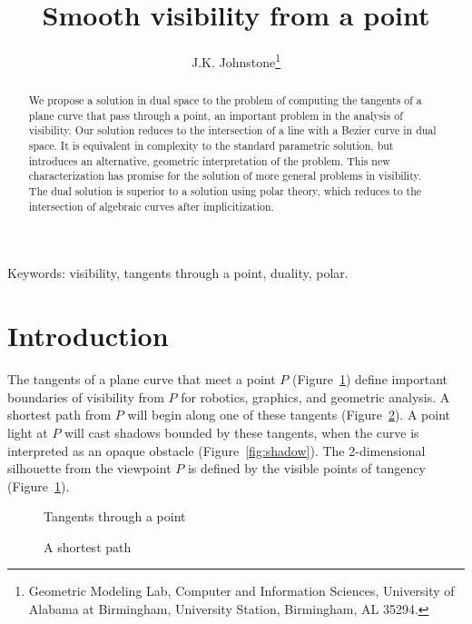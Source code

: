 \documentclass[11pt]{article}
\title{Smooth visibility from a point}
\author{J.K. Johnstone\thanks{Geometric Modeling Lab, 
	Computer and Information Sciences, University of Alabama at Birmingham, 
	University Station, Birmingham, AL 35294.}}
\begin{document}
\maketitle

\begin{abstract}
We propose a solution in dual space to the problem of
computing the tangents of a plane curve that pass through a point,
an important problem in the analysis of visibility.
Our solution reduces to the intersection of a line with a Bezier curve
in dual space.
It is equivalent in complexity to the standard parametric solution,
but introduces an alternative, geometric interpretation of the problem.
This new characterization has promise for the solution of more general problems in visibility.
The dual solution is superior to a solution using polar theory,
which reduces to the intersection of algebraic curves after implicitization.
\end{abstract}

Keywords: visibility, tangents through a point, duality, polar.

\section{Introduction}

The tangents of a plane curve that meet a point $P$ (Figure~\ref{fig:problem})
define important boundaries of visibility from $P$
for robotics, graphics, and geometric analysis.
A shortest path from $P$ will begin along one of these tangents 
(Figure~\ref{fig:motion}).
A point light at $P$ will cast shadows bounded by these tangents,
when the curve is interpreted as an opaque obstacle (Figure~\ref{fig:shadow}).
The 2-dimensional silhouette from the viewpoint $P$
is defined by the visible points of tangency (Figure~\ref{fig:problem}).



\begin{figure}
\hspace{2.1in} \setjjpopr
\caption{Tangents through a point}
\label{fig:problem}
\end{figure}



\begin{figure}
\hspace{2.6in} \setjjposh
\caption{A shortest path}
\label{fig:motion}
\end{figure}
\end{document}
